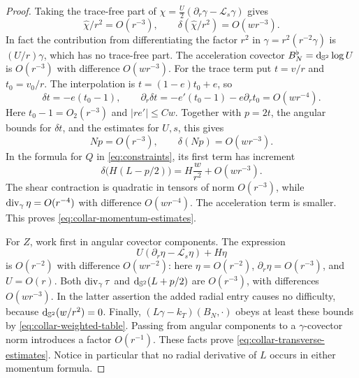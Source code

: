 \begin{proof}
Taking the trace-free part of
$\chi=\tfrac U2(\partial_r\gamma-\mathcal L_s\gamma)$ gives
\[
 \hat\chi/r^2=O(r^{-3}),\qquad
 \delta(\hat\chi/r^2)=O(wr^{-3}).
\]
In fact the contribution from differentiating the factor $r^2$ in
$\gamma=r^2(r^{-2}\gamma)$ is $(U/r)\gamma$, which has no trace-free
part.  The acceleration covector
$B_N^\flat=\mathrm d_{\mathbb S^2}\log U$ is $O(r^{-3})$ with difference
$O(wr^{-3})$.  For the trace term put $t=v/r$ and $t_0=v_0/r$. The interpolation
is $t=(1-e)t_0+e$, so
\[
 \delta t=-e(t_0-1),\qquad
 \partial_r\delta t=-e'(t_0-1)-e\partial_rt_0=O(wr^{-4}).
\]
Here $t_0-1=O_2(r^{-3})$ and $|re'|\leq Cw$. Together with
$p=2t$, the angular bounds for $\delta t$, and the estimates for $U,s$,
this gives
\[
 Np=O(r^{-3}),\qquad \delta(Np)=O(wr^{-3}).
\]
In the formula for $Q$ in \eqref{eq:constraints}, its first term has
increment
\[
 \delta\bigl(H(L-p/2)\bigr)
   =H\frac{w}{r^2}+O(wr^{-3}).
\]
The shear contraction is quadratic in tensors of norm $O(r^{-3})$,
while $\operatorname{div}_\gamma\eta=O(r^{-4})$ with difference $O(wr^{-4})$.
The acceleration term is smaller.  This proves
\eqref{eq:collar-momentum-estimates}.

For $Z$, work first in angular covector components.  The expression
\[
 U(\partial_r\eta-\mathcal L_s\eta)+H\eta
\]
is $O(r^{-2})$ with difference $O(wr^{-2})$: here
$\eta=O(r^{-2})$, $\partial_r\eta=O(r^{-3})$, and $U=O(r)$.
Both $\operatorname{div}_\gamma\tau$ and
$\mathrm d_{\mathbb S^2}(L+p/2)$ are $O(r^{-3})$, with differences $O(wr^{-3})$.
In the latter assertion the added radial entry causes no difficulty,
because $\mathrm d_{\mathbb S^2}(w/r^2)=0$.  Finally,
$(L\gamma-k_T)(B_N,\cdot)$ obeys at least these bounds by
\eqref{eq:collar-weighted-table}.  Passing from angular components to a
$\gamma$-covector norm introduces a factor $O(r^{-1})$.  These facts
prove \eqref{eq:collar-transverse-estimates}.  Notice in particular that
no radial derivative of $L$ occurs in either momentum formula.


\end{proof}
